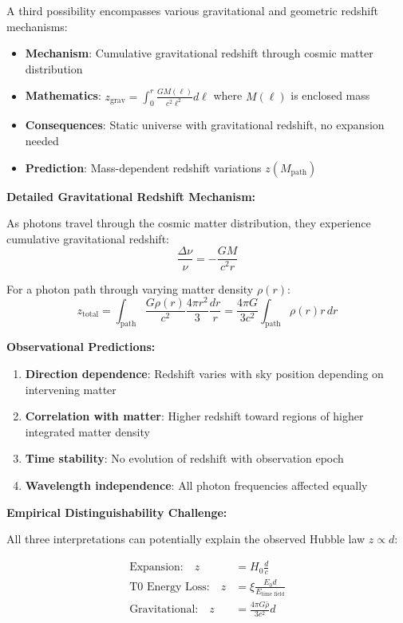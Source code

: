 \documentclass[12pt,a4paper]{report}
\begin{document}
A third possibility encompasses various gravitational and geometric redshift mechanisms:

\begin{itemize}
	\item \textbf{Mechanism}: Cumulative gravitational redshift through cosmic matter distribution
	\item \textbf{Mathematics}: $z_{\text{grav}} = \int_0^r \frac{GM(\ell)}{c^2\ell^2} d\ell$ where $M(\ell)$ is enclosed mass
	\item \textbf{Consequences}: Static universe with gravitational redshift, no expansion needed
	\item \textbf{Prediction}: Mass-dependent redshift variations $z(M_{\text{path}})$
\end{itemize}

\textbf{Detailed Gravitational Redshift Mechanism:}

As photons travel through the cosmic matter distribution, they experience cumulative gravitational redshift:
\begin{equation}
	\frac{\Delta \nu}{\nu} = -\frac{GM}{c^2 r}
\end{equation}

For a photon path through varying matter density $\rho(r)$:
\begin{equation}
	z_{\text{total}} = \int_{\text{path}} \frac{G\rho(r)}{c^2} \frac{4\pi r^2}{3} \frac{dr}{r} = \frac{4\pi G}{3c^2} \int_{\text{path}} \rho(r) r \, dr
\end{equation}

\textbf{Observational Predictions:}
\begin{enumerate}
	\item \textbf{Direction dependence}: Redshift varies with sky position depending on intervening matter
	\item \textbf{Correlation with matter}: Higher redshift toward regions of higher integrated matter density
	\item \textbf{Time stability}: No evolution of redshift with observation epoch
	\item \textbf{Wavelength independence}: All photon frequencies affected equally
\end{enumerate}

\textbf{Empirical Distinguishability Challenge:}

All three interpretations can potentially explain the observed Hubble law $z \propto d$:

\begin{align}
	\text{Expansion:} \quad z &= H_0 \frac{d}{c} \\
	\text{T0 Energy Loss:} \quad z &= \xi \frac{E_0 d}{E_{\text{time field}}} \\
	\text{Gravitational:} \quad z &= \frac{4\pi G \bar{\rho}}{3c^2} d
\end{align}
\end{document}
